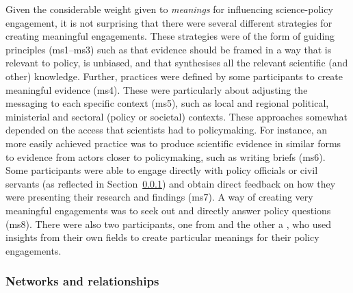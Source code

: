 Given the considerable weight given to \emph{meanings} for influencing science-policy engagement, it is not surprising that there were several different strategies for creating meaningful engagements. These strategies were of the form of guiding principles (ms1--ms3) such as that evidence should be framed in a way that is relevant to policy, is unbiased, and that synthesises all the relevant scientific (and other) knowledge. Further, practices were defined by some participants to create meaningful evidence (ms4). These were particularly about adjusting the messaging to each specific context (ms5), such as local and regional political, ministerial and sectoral (policy or societal) contexts. These approaches somewhat depended on the access that scientists had to policymaking. For instance, an more easily achieved practice was to produce scientific evidence in similar forms to evidence from actors closer to policymaking, such as writing briefs (ms6). Some participants were able to engage directly with policy officials or civil servants (as reflected in Section~\ref{sec:resnetwork}) and obtain direct feedback on how they were presenting their research and findings (ms7). A way of creating very meaningful engagements was to seek out and directly answer policy questions (ms8). There were also two participants, one from  and the other a , who used insights from their own fields to create particular meanings for their policy engagements. 

\subsubsection{Networks and relationships}\label{sec:resnetwork}

